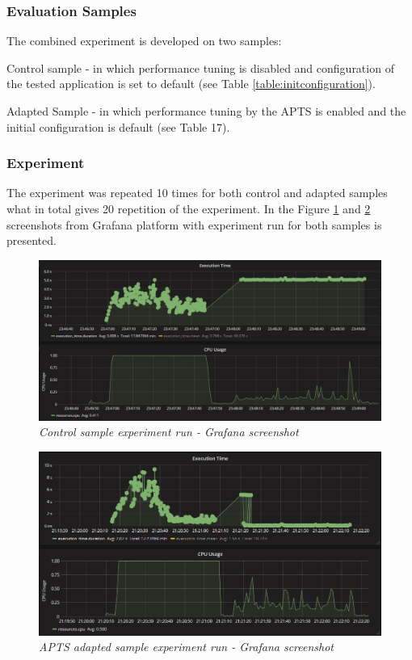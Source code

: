 \documentclass[12pt,a4paper]{article}
\let\tempone\itemize
\let\temptwo\enditemize
\renewenvironment{itemize}{\tempone\addtolength{\itemsep}{-0.4\baselineskip}}{\temptwo}
\begin{document}
\subsubsection{Evaluation Samples} 

The combined experiment is developed on two samples:
\begin{itemize}
\item Control sample - in which performance tuning is disabled and configuration of the tested application is set to default (see Table \ref{table:initconfiguration}). 
\item Adapted Sample - in which performance tuning by the APTS is enabled and the initial
configuration is default (see Table 17). 
\end{itemize}

\subsubsection{Experiment} 

The experiment was repeated 10 times for both control and adapted samples what in total gives 20 repetition of the experiment. In the Figure \ref{figure:combined:screen:control} and \ref{figure:combined:screen:adapted} screenshots from Grafana platform with experiment run for both samples is presented.

\begin{figure}[!htb]
\centering
\includegraphics[width=1\textwidth]{combinedCtrl}
\caption{\textit{Control sample experiment run - Grafana screenshot}} \label{figure:combined:screen:control}
\end{figure}
\begin{figure}[!htb]
\centering
\includegraphics[width=1\textwidth]{combinedEval}
\caption{\textit{APTS adapted sample experiment run - Grafana screenshot}} \label{figure:combined:screen:adapted}
\end{figure}
\end{document}
